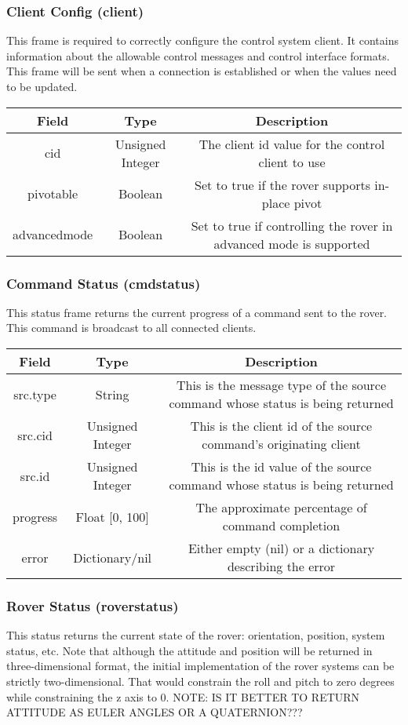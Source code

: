 \documentclass[letterpaper,10pt]{article}
\begin{document}
    \subsubsection{Client Config (client)}
      This frame is required to correctly configure the control system client.  It contains information about the allowable control messages and control interface formats.  This frame will be sent when a connection is established or when the values need to be updated.
      
      \begin{tabular}{ccc}
	\textbf{Field} & \textbf{Type} & \textbf{Description}\\\hline
	cid & Unsigned Integer & The client id value for the control client to use\\
	pivotable & Boolean & Set to true if the rover supports in-place pivot\\
	advancedmode & Boolean & Set to true if controlling the rover in advanced mode is supported\\
      \end{tabular}
      
    \subsubsection{Command Status (cmdstatus)}
      This status frame returns the current progress of a command sent to the rover.  This command is broadcast to all connected clients.
      
      \begin{tabular}{ccc}
	\textbf{Field} & \textbf{Type} & \textbf{Description}\\\hline
	src.type & String & This is the message type of the source command whose status is being returned\\
	src.cid & Unsigned Integer & This is the client id of the source command's originating client\\
	src.id & Unsigned Integer & This is the id value of the source command whose status is being returned\\
	progress & Float [0, 100] & The approximate percentage of command completion\\
	error & Dictionary/nil & Either empty (nil) or a dictionary describing the error\\
      \end{tabular}

    \subsubsection{Rover Status (roverstatus)}
      This status returns the current state of the rover: orientation, position, system status, etc.  Note that although the attitude and position will be returned in three-dimensional format, the initial implementation of the rover systems can be strictly two-dimensional.  That would constrain the roll and pitch to zero degrees while constraining the z axis to 0.  NOTE: IS IT BETTER TO RETURN ATTITUDE AS EULER ANGLES OR A QUATERNION???
      
\end{document}
